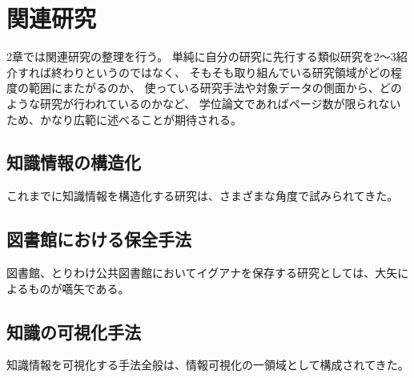 \chapter{関連研究}
\label{chap:relatedwork}

2章では関連研究の整理を行う。
単純に自分の研究に先行する類似研究を2～3紹介すれば終わりというのではなく、
そもそも取り組んでいる研究領域がどの程度の範囲にまたがるのか、
使っている研究手法や対象データの側面から、どのような研究が行われているのかなど、
学位論文であればページ数が限られないため、かなり広範に述べることが期待される。


\section{知識情報の構造化}

これまでに知識情報を構造化する研究は、さまざまな角度で試みられてきた。


\section{図書館における保全手法}

図書館、とりわけ公共図書館においてイグアナを保存する研究としては、大矢によるものが嚆矢である\cite{ohya:2004}。


\section{知識の可視化手法}

知識情報を可視化する手法全般は、情報可視化の一領域として構成されてきた\cite{kato:2019}\cite{aoi:2020}。

